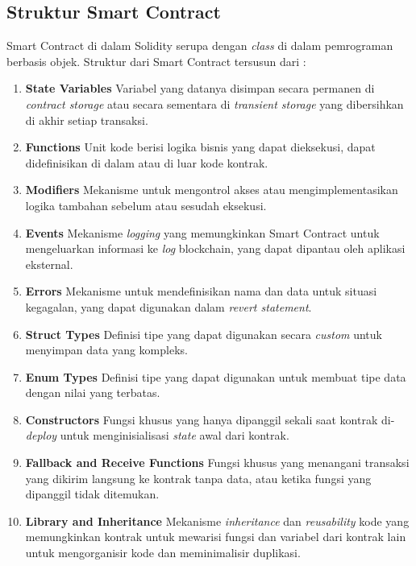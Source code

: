 \subsection{Struktur Smart Contract}
\label{subsec:struktur-smart-contract}

Smart Contract di dalam Solidity serupa dengan \textit{class} di dalam pemrograman berbasis objek. Struktur dari Smart Contract tersusun dari \parencite{solidity_structure}:

\begin{enumerate}
	\item \textbf{State Variables} \newline
	      Variabel yang datanya disimpan secara permanen di \textit{contract storage} atau secara sementara di \textit{transient storage} yang dibersihkan di akhir setiap transaksi.
	\item \textbf{Functions} \newline
	      Unit kode berisi logika bisnis yang dapat dieksekusi, dapat didefinisikan di dalam atau di luar kode kontrak.
	\item \textbf{Modifiers} \newline
	      Mekanisme untuk mengontrol akses atau mengimplementasikan logika tambahan sebelum atau sesudah eksekusi.
	\item \textbf{Events} \newline
	      Mekanisme \textit{logging} yang memungkinkan Smart Contract untuk mengeluarkan informasi ke \textit{log} blockchain, yang dapat dipantau oleh aplikasi eksternal.
	\item \textbf{Errors} \newline
	      Mekanisme untuk mendefinisikan nama dan data untuk situasi kegagalan, yang dapat digunakan dalam \textit{revert statement}.
	\item \textbf{Struct Types} \newline
	      Definisi tipe yang dapat digunakan secara \textit{custom} untuk menyimpan data yang kompleks.
	\item \textbf{Enum Types} \newline
	      Definisi tipe yang dapat digunakan untuk membuat tipe data dengan nilai yang terbatas.
	\item \textbf{Constructors} \newline
	      Fungsi khusus yang hanya dipanggil sekali saat kontrak di-\textit{deploy} untuk menginisialisasi \textit{state} awal dari kontrak.
	\item \textbf{Fallback and Receive Functions} \newline
	      Fungsi khusus yang menangani transaksi yang dikirim langsung ke kontrak tanpa data, atau ketika fungsi yang dipanggil tidak ditemukan.
	\item \textbf{Library and Inheritance} \newline
	      Mekanisme \textit{inheritance} dan \textit{reusability} kode yang memungkinkan kontrak untuk mewarisi fungsi dan variabel dari kontrak lain untuk mengorganisir kode dan meminimalisir duplikasi.
\end{enumerate}
